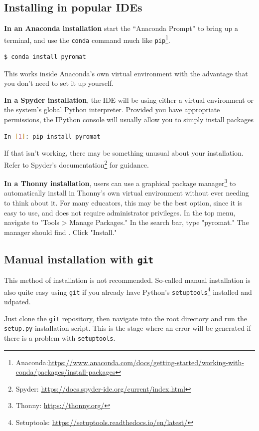 \subsection{Installing in popular IDEs}

\textbf{In an Anaconda installation} start the ``Anaconda Prompt'' to bring up a terminal, and use the \texttt{conda} command much like \texttt{pip}\footnote{Anaconda:\url{https://www.anaconda.com/docs/getting-started/working-with-conda/packages/install-packages}}.  
\begin{lstlisting}[language=bash]
$ conda install pyromat
\end{lstlisting}
This works inside Anaconda's own virtual environment with the advantage that you don't need to set it up yourself.

\textbf{In a Spyder installation}, the IDE will be using either a virtual environment or the system's global Python interpreter.  Provided you have appropriate permissions, the IPython console will usually allow you to simply install packages
\begin{lstlisting}[language=bash]
In [1]: pip install pyromat
\end{lstlisting}
If that isn't working, there may be something unusual about your installation.  Refer to Spyder's documentation\footnote{Spyder: \url{https://docs.spyder-ide.org/current/index.html}} for guidance.

\textbf{In a Thonny installation}, users can use a graphical package manager\footnote{Thonny: \url{https://thonny.org/}} to automatically install in Thonny's own virtual environment without ever needing to think about it.  For many educators, this may be the best option, since it is easy to use, and does not require administrator privileges.  In the top menu, navigate to "Tools > Manage Packages."  In the search bar, type "pyromat."  The manager should find \PM.  Click "Install."

\subsection{Manual installation with \texttt{git}}

This method of installation is not recommended.  So-called manual installation is also quite easy using \texttt{git} if you already have Python's \texttt{setuptools}\footnote{Setuptools: \url{https://setuptools.readthedocs.io/en/latest/}} installed and udpated.

Just clone the \texttt{git} repository, then navigate into the root directory and run the \texttt{setup.py} installation script.  This is the stage where an error will be generated if there is a problem with \texttt{setuptools}.

